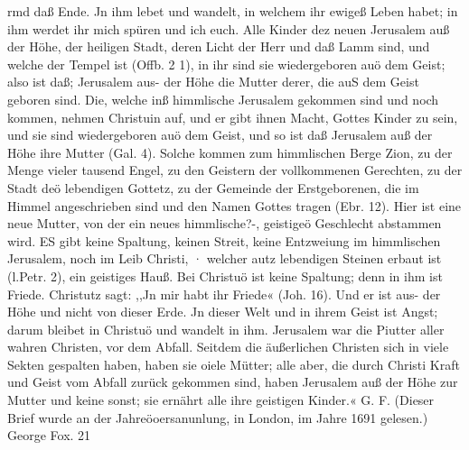 rmd daß Ende. Jn ihm lebet und wandelt, in welchem ihr
ewigeß Leben habet; in ihm werdet ihr mich spüren und ich euch.
Alle Kinder dez neuen Jerusalem auß der Höhe, der heiligen
Stadt, deren Licht der Herr und daß Lamm sind, und welche der
Tempel ist (Offb. 2 1), in ihr sind sie wiedergeboren auö dem
Geist; also ist daß; Jerusalem aus- der Höhe die Mutter derer,
die auS dem Geist geboren sind. Die, welche inß himmlische
Jerusalem gekommen sind und noch kommen, nehmen Christuin
auf, und er gibt ihnen Macht, Gottes Kinder zu sein, und sie sind
wiedergeboren auö dem Geist, und so ist daß Jerusalem auß der
Höhe ihre Mutter (Gal. 4). Solche kommen zum himmlischen
Berge Zion, zu der Menge vieler tausend Engel, zu den Geistern
der vollkommenen Gerechten, zu der Stadt deö lebendigen Gottetz,
zu der Gemeinde der Erstgeborenen, die im Himmel angeschrieben
sind und den Namen Gottes tragen (Ebr. 12). Hier ist eine
neue Mutter, von der ein neues himmlische?-, geistigeö Geschlecht
abstammen wird. ES gibt keine Spaltung, keinen Streit, keine
Entzweiung im himmlischen Jerusalem, noch im Leib Christi,
· welcher autz lebendigen Steinen erbaut ist (l.Petr. 2), ein geistiges
Hauß. Bei Christuö ist keine Spaltung; denn in ihm ist Friede.
Christutz sagt: ,,Jn mir habt ihr Friede« (Joh. 16). Und er ist
aus- der Höhe und nicht von dieser Erde. Jn dieser Welt und
in ihrem Geist ist Angst; darum bleibet in Christuö und wandelt
in ihm.
Jerusalem war die Piutter aller wahren Christen, vor dem
Abfall. Seitdem die äußerlichen Christen sich in viele Sekten
gespalten haben, haben sie oiele Mütter; alle aber, die durch
Christi Kraft und Geist vom Abfall zurück gekommen sind, haben
Jerusalem auß der Höhe zur Mutter und keine sonst; sie ernährt
alle ihre geistigen Kinder.« G. F.
(Dieser Brief wurde an der Jahreöoersanunlung, in London,
im Jahre 1691 gelesen.)
George Fox. 21



